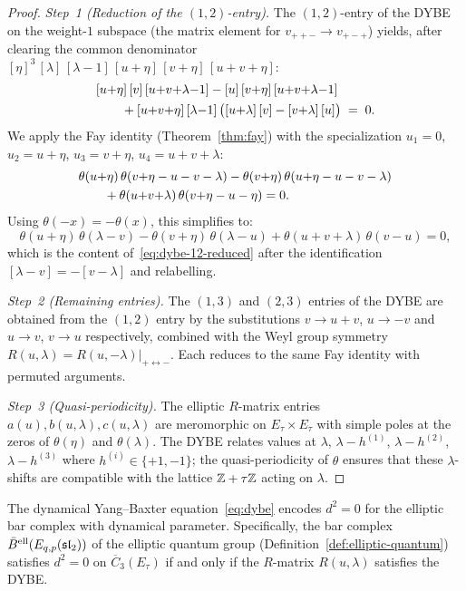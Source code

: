\begin{proof}
\emph{Step~1 (Reduction of the $(1,2)$-entry).}
The $(1,2)$-entry of the DYBE on the weight-$1$ subspace
(the matrix element for $v_{++-} \to v_{+-+}$) yields,
after clearing the common denominator
$[\eta]^3\,[\lambda]\,[\lambda{-}1]\,[u{+}\eta]\,[v{+}\eta]\,
[u{+}v{+}\eta]$:
\begin{align}\label{eq:dybe-12-reduced}
&[u{+}\eta]\,[v]\,[u{+}v{+}\lambda{-}1]
- [u]\,[v{+}\eta]\,[u{+}v{+}\lambda{-}1] \notag \\
&\qquad + [u{+}v{+}\eta]\,[\lambda{-}1]\,
\bigl([u{+}\lambda]\,[v] - [v{+}\lambda]\,[u]\bigr)
\;=\; 0.
\end{align}
We apply the Fay identity (Theorem~\ref{thm:fay})
with the specialization $u_1 = 0$, $u_2 = u + \eta$,
$u_3 = v + \eta$, $u_4 = u + v + \lambda$:
\begin{align}
&\theta(u{+}\eta)\,\theta(v{+}\eta - u - v - \lambda)
- \theta(v{+}\eta)\,\theta(u{+}\eta - u - v - \lambda) \notag \\
&\qquad + \theta(u{+}v{+}\lambda)\,\theta(v{+}\eta - u - \eta)
= 0.
\end{align}
Using $\theta(-x) = -\theta(x)$, this simplifies to:
\[
\theta(u{+}\eta)\,\theta(\lambda{-}v)
- \theta(v{+}\eta)\,\theta(\lambda{-}u)
+ \theta(u{+}v{+}\lambda)\,\theta(v{-}u) = 0,
\]
which is the content of~\eqref{eq:dybe-12-reduced}
after the identification $[\lambda{-}v] = -[v{-}\lambda]$
and relabelling.

\emph{Step~2 (Remaining entries).}
The $(1,3)$ and $(2,3)$ entries of the DYBE are obtained
from the $(1,2)$ entry by the substitutions
$v \to u+v$, $u \to -v$ and $u \to v$, $v \to u$ respectively,
combined with the Weyl group symmetry
$R(u,\lambda) = R(u,-\lambda)|_{+\leftrightarrow -}$.
Each reduces to the same Fay identity with permuted arguments.

\emph{Step~3 (Quasi-periodicity).}
The elliptic $R$-matrix entries $a(u), b(u,\lambda), c(u,\lambda)$
are meromorphic on $E_\tau \times E_\tau$ with simple poles at the
zeros of $\theta(\eta)$ and $\theta(\lambda)$.  The DYBE
relates values at $\lambda$, $\lambda - h^{(1)}$, $\lambda - h^{(2)}$,
$\lambda - h^{(3)}$ where $h^{(i)} \in \{+1, -1\}$; the
quasi-periodicity of $\theta$ ensures that these $\lambda$-shifts
are compatible with the lattice $\mathbb{Z} + \tau\mathbb{Z}$ acting on $\lambda$.
\end{proof}

\begin{proposition}
\label{prop:dybe-bar-nilpotency}
The dynamical Yang--Baxter equation~\eqref{eq:dybe} encodes
$d^2 = 0$ for the elliptic bar complex with dynamical parameter.
Specifically, the bar complex
$\bar{B}^{\mathrm{ell}}(E_{q,p}(\mathfrak{sl}_2))$
of the elliptic quantum group
\textup{(}Definition~\textup{\ref{def:elliptic-quantum})}
satisfies $d^2 = 0$ on
$\overline{C}_3(E_\tau)$ if and only if the $R$-matrix
$R(u,\lambda)$ satisfies the DYBE.
\end{proposition}

